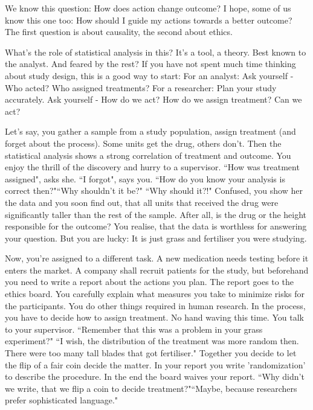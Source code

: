 We know this question:
How does action change outcome?
I hope, some of us know this one too: 
How should I guide my actions towards a better outcome?
The first question is about causality, the second about ethics.

What's the role of statistical analysis in this?
It's a tool, a theory. Best known to the analyst. And feared by the rest?
If you have not spent much time thinking about study design, this is a good way to start: 
For an analyst: Ask yourself - Who acted? Who assigned treatments?
For a researcher: Plan your study accurately. Ask yourself - How do we act? How do we assign treatment? Can we act?

Let's say, you gather a sample from a study population, assign treatment (and forget about the process). Some units get the drug, others don't. Then the statistical analysis shows a strong correlation of treatment and outcome. You enjoy the thrill of the discovery and hurry to a supervisor. “How was treatment assigned", asks she. “I forgot", says you.
“How do you know your analysis is correct then?"“Why shouldn't it be?"
“Why should it?!"
Confused, you show her the data and you soon find out, that all units that received the drug were significantly taller than the rest of the sample.
After all, is the drug or the height responsible for the outcome?
You realise, that the data is worthless for answering your question.
But you are lucky: It is just grass and fertiliser you were studying.

Now, you're assigned to a different task. A new medication needs testing before it enters the market. 
A company shall recruit patients for the study, but beforehand you need to write a report about the actions you plan. The report goes to the ethics board. You carefully  explain what measures you take to minimize risks for the participants.
You do other things required in human research.
In the process, you have to decide how to assign treatment.
No hand waving this time. You talk to your supervisor.
“Remember that this was a problem in your grass experiment?"
“I wish, the distribution of the treatment was more random then. There were too many tall blades that got fertiliser."
Together you decide to let the flip of a fair coin decide the matter. In your report you write 'randomization' to describe the procedure. In the end the board waives your report. “Why didn't we write, that we flip a coin to decide treatment?"“Maybe, because researchers prefer sophisticated language."

